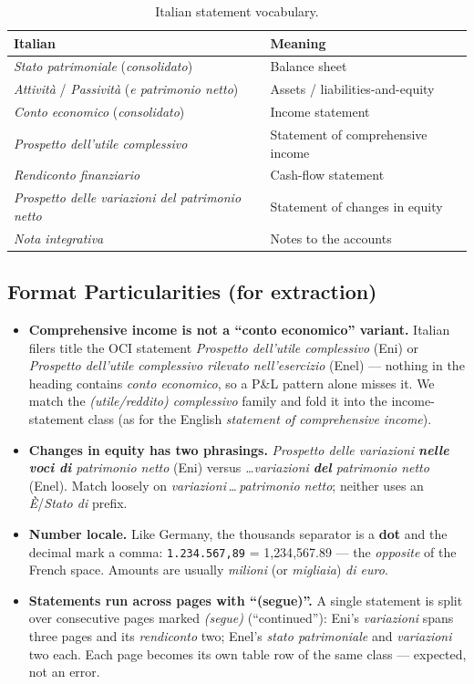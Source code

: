 \documentclass[11pt,a4paper]{report}
\begin{document}
\begin{table}[h]
\centering
\caption{Italian statement vocabulary.}
\label{tab:it-vocab}
\small
\begin{tabular}{@{}p{}p{}@{}}
\toprule
\textbf{Italian} & \textbf{Meaning} \\
\midrule
\emph{Stato patrimoniale} (\emph{consolidato}) & Balance sheet \\
\emph{Attività} / \emph{Passività} (\emph{e patrimonio netto}) & Assets / liabilities-and-equity \\
\emph{Conto economico} (\emph{consolidato}) & Income statement \\
\emph{Prospetto dell'utile complessivo} & Statement of comprehensive income \\
\emph{Rendiconto finanziario} & Cash-flow statement \\
\emph{Prospetto delle variazioni del patrimonio netto} & Statement of changes in equity \\
\emph{Nota integrativa} & Notes to the accounts \\
\bottomrule
\end{tabular}
\end{table}

\subsection{Format Particularities (for extraction)}

\begin{itemize}
  \item \textbf{Comprehensive income is not a ``conto economico'' variant.} Italian filers title the OCI
    statement \emph{Prospetto dell'utile complessivo} (Eni) or \emph{Prospetto dell'utile complessivo
    rilevato nell'esercizio} (Enel) --- nothing in the heading contains \emph{conto economico}, so a P\&L
    pattern alone misses it. We match the \emph{(utile/reddito) complessivo} family and fold it into the
    income-statement class (as for the English \emph{statement of comprehensive income}).
  \item \textbf{Changes in equity has two phrasings.} \emph{Prospetto delle variazioni \textbf{nelle voci
    di} patrimonio netto} (Eni) versus \emph{\dots variazioni \textbf{del} patrimonio netto} (Enel). Match
    loosely on \emph{variazioni\,\dots\,patrimonio netto}; neither uses an \emph{È}/\emph{Stato di} prefix.
  \item \textbf{Number locale.} Like Germany, the thousands separator is a \textbf{dot} and the decimal mark
    a comma: \texttt{1.234.567,89} = 1{,}234{,}567.89 --- the \emph{opposite} of the French space. Amounts
    are usually \emph{milioni} (or \emph{migliaia}) \emph{di euro}.
  \item \textbf{Statements run across pages with ``(segue)''.} A single statement is split over consecutive
    pages marked \emph{(segue)} (``continued''): Eni's \emph{variazioni} spans three pages and its
    \emph{rendiconto} two; Enel's \emph{stato patrimoniale} and \emph{variazioni} two each. Each page becomes
    its own table row of the same class --- expected, not an error.
\end{itemize}
\end{document}
